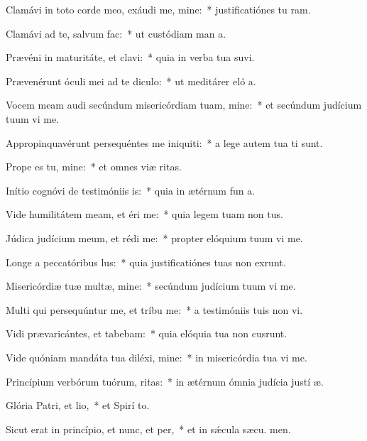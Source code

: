 \item Clamávi in toto corde meo, exáudi me, mine:~* justificatiónes tu ram.
\item Clamávi ad te, salvum  fac:~* ut custódiam man a.
\item Prævéni in maturitáte, et clavi:~* quia in verba tua suvi.
\item Prævenérunt óculi mei ad te diculo:~* ut meditárer eló a.
\item Vocem meam audi secúndum misericórdiam tuam, mine:~* et secúndum judícium tuum vi me.
\item Appropinquavérunt persequéntes me iniquiti:~* a lege autem tua  ti sunt.
\item Prope es tu, mine:~* et omnes viæ  ritas.
\item Inítio cognóvi de testimóniis is:~* quia in ætérnum fun a.
\item Vide humilitátem meam, et éri me:~* quia legem tuam non  tus.
\item Júdica judícium meum, et rédi me:~* propter elóquium tuum vi me.
\item Longe a peccatóribus lus:~* quia justificatiónes tuas non exrunt.
\item Misericórdiæ tuæ multæ, mine:~* secúndum judícium tuum vi me.
\item Multi qui persequúntur me, et tríbu me:~* a testimóniis tuis non vi.
\item Vidi prævaricántes, et tabebam:~* quia elóquia tua non cusrunt.
\item Vide quóniam mandáta tua diléxi, mine:~* in misericórdia tua vi me.
\item Princípium verbórum tuórum, ritas:~* in ætérnum ómnia judícia justí æ.
\item Glória Patri, et lio,~* et Spirí to.
\item Sicut erat in princípio, et nunc, et per,~* et in sǽcula sæcu. men.
